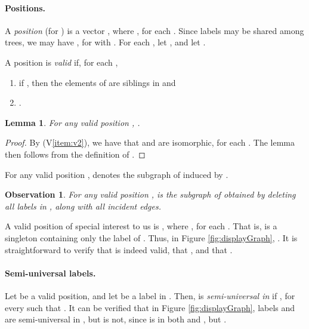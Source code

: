 \documentclass[11pt]{article}
\newtheorem{lemma}{Lemma}
\newtheorem{observation}{Observation}
\theoremstyle{definition}
\begin{document}
\vspace{-1.5\parsep}

\paragraph{Positions.} A \emph{position} (for ) is a vector , where , for each .  Since labels may be shared among trees, we may have , for  with .   
For each , let , and let .  


A position  is \emph{valid} if, for each , 
\vspace{-0.1cm}
\begin{enumerate}[(V1)]
\vspace{-0.5\parskip}
 \itemsep1pt \parskip0pt 
\item\label{item:v1}
if , then the elements of  are siblings in  and
\item\label{item:v2}
.
\end{enumerate}
\vspace{-1\parsep}

\begin{lemma}\label{lem:V2}
For any valid position , .
\end{lemma}
\begin{proof}
By (V\ref{item:v2}), we have that  and  are isomorphic, for each . The lemma then follows from the definition of .
\end{proof}

For any valid position ,  denotes the subgraph of  induced by .

\begin{observation}\label{obs:update1}
For any valid position ,  is the subgraph of  obtained by deleting all labels in , along with all incident edges.
\end{observation}

A valid position of special interest to us is , where 
, for each .  That is,  is a singleton containing only the label of .  Thus, in Figure \ref{fig:displayGraph}, .
It is straightforward to verify that  is indeed valid, that , and that .  

\vspace{-1.5\parsep}

\paragraph{Semi-universal labels.} Let  be a valid position, and let  be a label in .  Then,  is \emph{semi-universal in } if  , for every  such that .
It can be verified that in Figure \ref{fig:displayGraph}, labels  and  are semi-universal in , but  is not, since  is in both  and , but .  
\end{document}
